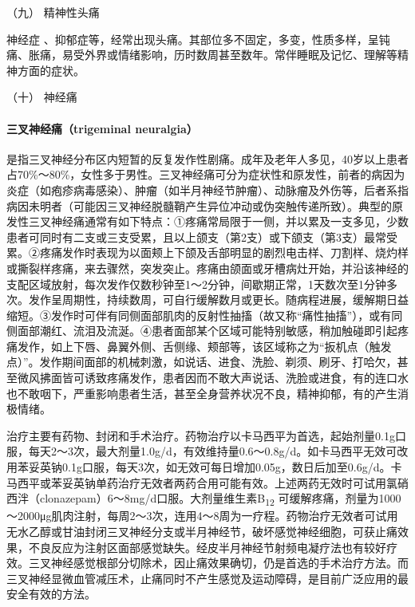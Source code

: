 \hypertarget{text00020.htmlux5cux23CHP1-7-4-9}{}
（九） 精神性头痛

神经症
、抑郁症等，经常出现头痛。其部位多不固定，多变，性质多样，呈钝痛、胀痛，易受外界或情绪影响，历时数周甚至数年。常伴睡眠及记忆、理解等精神方面的症状。

\hypertarget{text00020.htmlux5cux23CHP1-7-4-10}{}
（十） 神经痛

\paragraph{三叉神经痛（trigeminal neuralgia）}

是指三叉神经分布区内短暂的反复发作性剧痛。成年及老年人多见，40岁以上患者占70\%～80\%，女性多于男性。三叉神经痛可分为症状性和原发性，前者的病因为炎症（如疱疹病毒感染）、肿瘤（如半月神经节肿瘤）、动脉瘤及外伤等，后者系指病因未明者（可能因三叉神经脱髓鞘产生异位冲动或伪突触传递所致）。典型的原发性三叉神经痛通常有如下特点：①疼痛常局限于一侧，并以累及一支多见，少数患者可同时有二支或三支受累，且以上颌支（第2支）或下颌支（第3支）最常受累。②疼痛发作时表现为以面颊上下颌及舌部明显的剧烈电击样、刀割样、烧灼样或撕裂样疼痛，来去骤然，突发突止。疼痛由颌面或牙槽病灶开始，并沿该神经的支配区域放射，每次发作仅数秒钟至1～2分钟，间歇期正常，1天数次至1分钟多次。发作呈周期性，持续数周，可自行缓解数月或更长。随病程进展，缓解期日益缩短。③发作时可伴有同侧面部肌肉的反射性抽搐（故又称“痛性抽搐”），或有同侧面部潮红、流泪及流涎。④患者面部某个区域可能特别敏感，稍加触碰即引起疼痛发作，如上下唇、鼻翼外侧、舌侧缘、颊部等，该区域称之为“扳机点（触发点）”。发作期间面部的机械刺激，如说话、进食、洗脸、剃须、刷牙、打哈欠，甚至微风拂面皆可诱致疼痛发作，患者因而不敢大声说话、洗脸或进食，有的连口水也不敢咽下，严重影响患者生活，甚至全身营养状况不良，精神抑郁，有的产生消极情绪。

治疗主要有药物、封闭和手术治疗。药物治疗以卡马西平为首选，起始剂量0.1g口服，每天2～3次，最大剂量1.0g/d，有效维持量0.6～0.8g/d。如卡马西平无效可改用苯妥英钠0.1g口服，每天3次，如无效可每日增加0.05g，数日后加至0.6g/d。卡马西平或苯妥英钠单药治疗无效者两药合用可能有效。上述两药无效时可试用氯硝西泮（clonazepam）6～8mg/d口服。大剂量维生素B\textsubscript{12}
可缓解疼痛，剂量为1000～2000μg肌肉注射，每周2～3次，连用4～8周为一疗程。药物治疗无效者可试用无水乙醇或甘油封闭三叉神经分支或半月神经节，破坏感觉神经细胞，可获止痛效果，不良反应为注射区面部感觉缺失。经皮半月神经节射频电凝疗法也有较好疗效。三叉神经感觉根部分切除术，因止痛效果确切，仍是首选的手术治疗方法。而三叉神经显微血管减压术，止痛同时不产生感觉及运动障碍，是目前广泛应用的最安全有效的方法。

